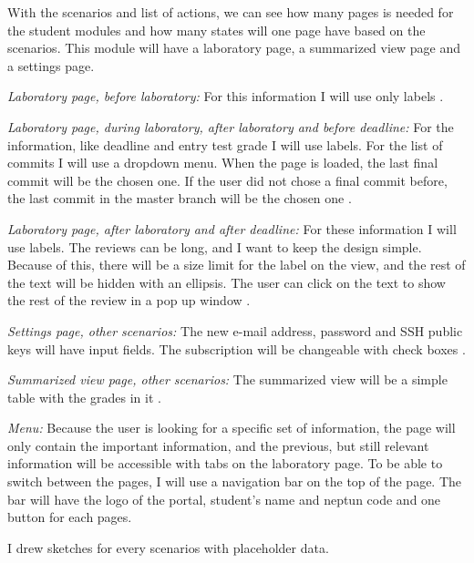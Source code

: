 With the scenarios and list of actions, we can see how many pages is needed for the student modules and how many states will one page have based on the scenarios. This module will have a laboratory page, a summarized view page and a settings page.

\emph{Laboratory page, before laboratory:} For this information I will use only labels .

\emph{Laboratory page, during laboratory, after laboratory and before deadline:} For the information, like deadline and entry test grade I will use labels. For the list of commits I will use a dropdown menu. When the page is loaded, the last final commit will be the chosen one. If the user did not chose a final commit before, the last commit in the master branch will be the chosen one .

\emph{Laboratory page, after laboratory and after deadline:} For these information I will use labels. The reviews can be long, and I want to keep the design simple. Because of this, there will be a size limit for the label on the view, and the rest of the text will be hidden with an ellipsis. The user can click on the text to show the rest of the review in a pop up window .

\emph{Settings page, other scenarios:} The new e-mail address, password and SSH public keys will have input fields. The subscription will be changeable with check boxes . 

\emph{Summarized view page, other scenarios:} The summarized view will be a simple table with the grades in it .

\emph{Menu:} Because the user is looking for a specific set of information, the page will only contain the important information, and the previous, but still relevant information will be accessible with tabs on the laboratory page. To be able to switch between the pages, I will use a navigation bar on the top of the page. The bar will have the logo of the portal, student's name and neptun code and one button for each pages.

I drew sketches  for every scenarios with placeholder data. 
